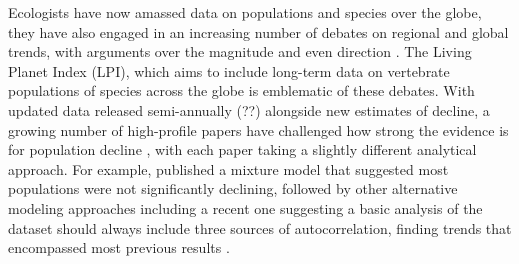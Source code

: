 \documentclass[11pt]{article}
\begin{document}
\begin{tcolorbox}
{\begin{multicols}{2}
Ecologists have now amassed data on populations and species over the globe, they have also engaged in an increasing number of debates on regional and global trends, with arguments over the magnitude and even direction \citep{Dornelas2014,Leung2020,terry2022no,muller2024weather}. The Living Planet Index (LPI), which aims to include long-term data on vertebrate populations of species across the globe is emblematic of these debates. With updated data released semi-annually (??) alongside new estimates of decline, a growing number of high-profile papers have challenged how strong the evidence is for population decline \citep{Dornelas2014,gonzalez2016estimating,wagner2021insect,muller2024weather}, with each paper taking a slightly different analytical approach. For example, \citet{Leung2020} published a mixture model that suggested most populations were not significantly declining, followed by other alternative modeling approaches \citep{Buschke2021,puurtinen2022living} including a recent one suggesting a basic analysis of the dataset should always include three sources of autocorrelation, finding trends that encompassed most previous results \citep{Johnson2024}. 


\end{multicols}}
\end{tcolorbox}
\end{document}
